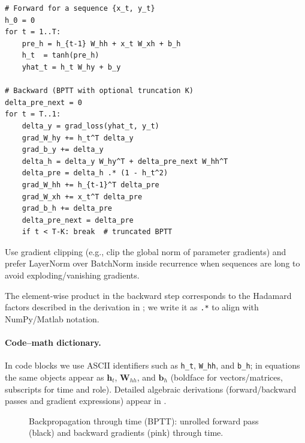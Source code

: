 \begin{tcolorbox}[summarybox, title={Simple (ungated) RNN cell (forward + BPTT)}]
\begin{verbatim}
# Forward for a sequence {x_t, y_t}
h_0 = 0
for t = 1..T:
    pre_h = h_{t-1} W_hh + x_t W_xh + b_h
    h_t  = tanh(pre_h)
    yhat_t = h_t W_hy + b_y

# Backward (BPTT with optional truncation K)
delta_pre_next = 0
for t = T..1:
    delta_y = grad_loss(yhat_t, y_t)
    grad_W_hy += h_t^T delta_y
    grad_b_y += delta_y
    delta_h = delta_y W_hy^T + delta_pre_next W_hh^T
    delta_pre = delta_h .* (1 - h_t^2)
    grad_W_hh += h_{t-1}^T delta_pre
    grad_W_xh += x_t^T delta_pre
    grad_b_h += delta_pre
    delta_pre_next = delta_pre
    if t < T-K: break  # truncated BPTT
\end{verbatim}
Use gradient clipping (e.g., clip the global norm of parameter gradients) and prefer LayerNorm over BatchNorm inside recurrence when sequences are long to avoid exploding/vanishing gradients.
\end{tcolorbox}

The element-wise product in the backward step corresponds to the Hadamard factors described in the derivation in ; we write it as \texttt{.*} to align with NumPy/Matlab notation.
\paragraph{Code--math dictionary.}
In code blocks we use ASCII identifiers such as \texttt{h\_t}, \texttt{W\_hh}, and \texttt{b\_h}; in equations the same objects appear as \(\mathbf{h}_t\), \(\mathbf{W}_{hh}\), and \(\mathbf{b}_h\) (boldface for vectors/matrices, subscripts for time and role). Detailed algebraic derivations (forward/backward passes and gradient expressions) appear in .

\begin{figure}[t]
    \centering
    \caption{Backpropagation through time (BPTT): unrolled forward pass (black) and backward gradients (pink) through time.}
    \label{fig:lec7-bptt}
\end{figure}


